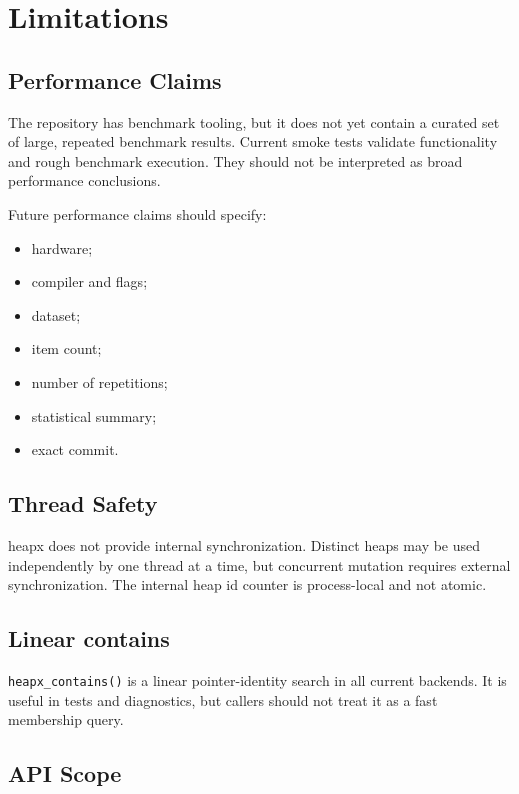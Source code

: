 \chapter{Limitations}

\section{Performance Claims}

The repository has benchmark tooling, but it does not yet contain a curated set of large, repeated benchmark results.
Current smoke tests validate functionality and rough benchmark execution.
They should not be interpreted as broad performance conclusions.

Future performance claims should specify:

\begin{itemize}
    \item hardware;
    \item compiler and flags;
    \item dataset;
    \item item count;
    \item number of repetitions;
    \item statistical summary;
    \item exact commit.
\end{itemize}

\section{Thread Safety}

heapx does not provide internal synchronization.
Distinct heaps may be used independently by one thread at a time, but concurrent mutation requires external synchronization.
The internal heap id counter is process-local and not atomic.

\section{Linear contains}

\texttt{heapx\_contains()} is a linear pointer-identity search in all current backends.
It is useful in tests and diagnostics, but callers should not treat it as a fast membership query.

\section{API Scope}

